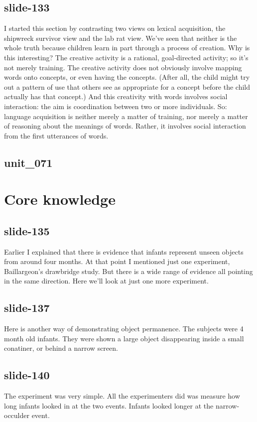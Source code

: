 \documentclass[12pt,\papersize]{extarticle}
\begin{document}
 
\subsection{slide-133}
I started this section by contrasting two views on lexical acquisition, the shipwreck survivor view and the lab rat view.
We've seen that neither is the whole truth because children learn in part through a process of creation.
Why is this interesting?
The creative activity is a rational, goal-directed activity; so it's not merely training.
The creative activity does not obviously involve mapping words onto concepts, or even having the concepts.
(After all, the child might try out a pattern of use that others see as appropriate for a concept before the child actually has that concept.)
And this creativity with words involves social interaction: the aim is coordination between two or more individuals.
So: language acquisition is neither merely a matter of training, nor merely a matter of reasoning about the meanings of words.
Rather, it involves social interaction from the first utterances of words.
 
 
\subsection{unit\_071}
 
\section{Core knowledge}
 
 
\subsection{slide-135}
Earlier I explained that there is evidence that infants represent unseen objects from around four months.
At that point I mentioned just one experiment, Baillargeon's drawbridge study.
But there is a wide range of evidence all pointing in the same direction.
Here we'll look at just one more experiment.
 
 
\subsection{slide-137}
Here is another way of demonstrating object permanence.
The subjects were 4 month old infants.
They were shown a large object disappearing inside a small conatiner, or behind a narrow screen.
 
 
\subsection{slide-140}
The experiment was very simple.
All the experimenters did was measure how long infants looked in at the two events.
Infants looked longer at the narrow-occulder event.
 
\end{document}

